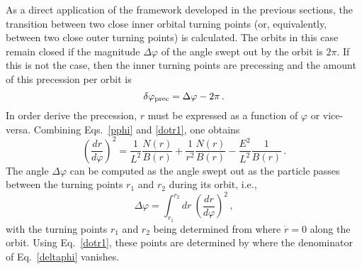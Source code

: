 \documentclass[a4paper,aps,twocolumn,showpacs,showkeys,nofootinbib,preprintnumbers,superscriptaddress,amsmath,amssymb,amsfonts]{revtex4-1}
\newcommand{\ie}{{i.e.,}~}
\begin{document}
As a direct application of the framework developed in the previous
sections, the transition between two close inner orbital turning
points (or, equivalently, between two close outer turning points) is
calculated. The orbits in this case remain closed if the magnitude
$\Delta \varphi$ of the angle swept out by the orbit is $2\pi$.
If this is not the case, then the inner turning points are
precessing and the amount of this precession per orbit is
%
\begin{equation} 
  \delta\varphi_{\rm prec} = \Delta \varphi - 2\pi \,. 
\end{equation}
%
In order derive the precession, $r$ must be expressed as a function of
$\varphi$ or vice-versa. Combining Eqs.~\eqref{pphi} and \eqref{dotr1},
one obtains
%
\begin{equation} \label{drdphi}
\left(\frac{dr}{d\varphi}\right)^2 = 
\frac{1}{L^{2}}\frac{N(r)}{B(r)} + 
\frac{1}{r^{2}}\frac{N(r)}{B(r)} 
- \frac{E^{2}}{L^{2}} \frac{1}{B(r)} \,.
\end{equation}
The angle $\Delta \varphi$ can be computed as 
the angle swept out as the particle passes between
the turning points $r_1$ and $r_2$ during its orbit, \ie
%
\begin{equation} \label{deltaphi}    
\Delta \varphi= \int^{r_2}_{r_1} dr \ \! \left(\frac{dr}{d\varphi}\right)^2 \,,
\end{equation}  
%
with the turning points $r_1$ and $r_2$ being determined from where
${\dot r}=0$ along the orbit. Using Eq.~\eqref{dotr1},
these points are determined by where the denominator of 
Eq.~\eqref{deltaphi} vanishes.
\end{document}
